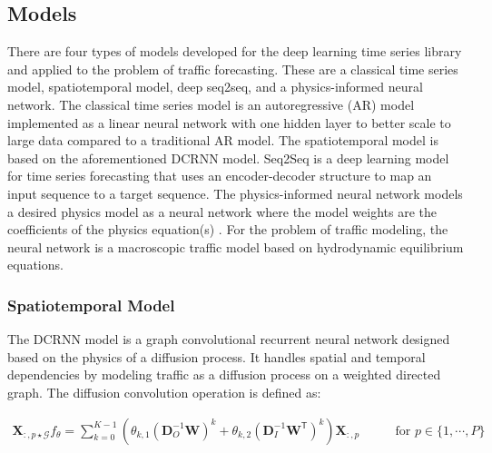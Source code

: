 \documentclass{article}
\begin{document}

\subsection{Models}
\label{sec:models}

There are four types of models developed for the deep learning time series library and applied to the problem of traffic forecasting. These are a classical time series model, spatiotemporal model, deep seq2seq, and a physics-informed neural network. The classical time series model is an autoregressive (AR) model implemented as a linear neural network with one hidden layer to better scale to large data compared to a traditional AR model. The spatiotemporal model is based on the aforementioned DCRNN model. Seq2Seq is a deep learning model for time series forecasting that uses an encoder-decoder structure to map an input sequence to a target sequence. The physics-informed neural network models a desired physics model as a neural network where the model weights are the coefficients of the physics equation(s) \cite{lagaris1998artificial, raissi2019physics, wang2020bridging}. For the problem of traffic modeling, the neural network is a macroscopic traffic model based on hydrodynamic equilibrium equations.

\subsubsection{Spatiotemporal Model}

The DCRNN model \cite{li2018dcrnn_traffic} is a graph convolutional recurrent neural network designed based on the physics of a diffusion process. It handles spatial and temporal dependencies by modeling traffic as a diffusion process on a weighted directed graph. The diffusion convolution operation is defined as:

\begin{equation}
    \begin{split}
        \mathbf{X}_{:,p\star\mathcal{G}}f_{\theta}=\sum_{k=0}^{K-1}\left( \theta_{k,1}(\mathbf{D}_O^{-1}\mathbf{W})^k+\theta_{k,2}(\mathbf{D}_I^{-1}\mathbf{W}^\mathsf{T})^k \right)\mathbf{X}_{:,p}
    \end{split}
    \qquad
    \begin{split}
        \text{for } p \in \{1,\cdots,P\}
    \end{split}
\end{equation}
\end{document}
